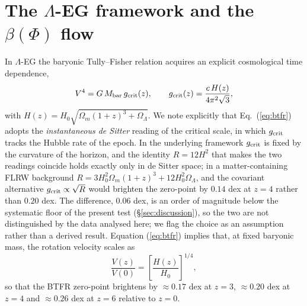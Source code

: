\documentclass{rmxaa}
\newcommand{\gcrit}{g_{\rm crit}}
\newcommand{\Mbar}{M_{\rm bar}}
\newcommand{\LEG}{\mbox{$\Lambda$-EG}}
\begin{document}
\section{The \LEG{} framework and the $\beta(\Phi)$ flow}
\label{sec:framework}

In \LEG{} the baryonic Tully--Fisher relation acquires an explicit
cosmological time dependence,
\begin{equation}
  \label{eq:btfr}
  V^4 = G\,\Mbar\,\gcrit(z), \qquad
  \gcrit(z)=\frac{c\,H(z)}{4\pi^2\sqrt{3}},
\end{equation}
with $H(z)=H_0\sqrt{\Omega_m(1+z)^3+\Omega_\Lambda}$. We note explicitly that
Eq.~(\ref{eq:btfr}) adopts the \emph{instantaneous de Sitter} reading of
the critical scale, in which $\gcrit$ tracks the Hubble rate of the epoch.
In the underlying framework $\gcrit$ is fixed by the curvature of the
horizon, and the identity $R=12H^2$ that makes the two readings coincide
holds exactly only in de Sitter space; in a matter-containing FLRW
background $R=3H_0^2\Omega_m(1+z)^3+12H_0^2\Omega_\Lambda$, and the
covariant alternative $\gcrit\propto\sqrt{R}$ would brighten the
zero-point by $0.14$ dex at $z=4$ rather than $0.20$ dex. The difference,
$0.06$ dex, is an order of magnitude below the systematic floor of the
present test (\S\ref{sec:discussion}), so the two are not distinguished by
the data analysed here; we flag the choice as an assumption rather than a
derived result. Equation
(\ref{eq:btfr}) implies that, at fixed baryonic mass, the rotation
velocity scales as
\begin{equation}
  \label{eq:Vevol}
  \frac{V(z)}{V(0)}=\left[\frac{H(z)}{H_0}\right]^{1/4},
\end{equation}
so that the BTFR zero-point brightens by $\approx0.17$ dex at $z=3$,
$\approx0.20$ dex at $z=4$ and $\approx0.26$ dex at $z=6$ relative to
$z=0$.
\end{document}

